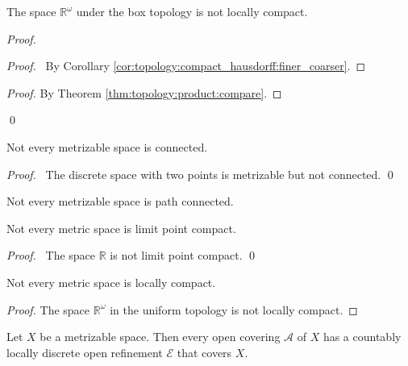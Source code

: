 \begin{prop}
The space $\mathbb{R}^\omega$ under the box topology is not locally compact.
\end{prop}

\begin{proof}
\pf
{}
\begin{proof}
  \pf\ By Corollary \ref{cor:topology:compact_hausdorff:finer_coarser}.
\end{proof}
\begin{proof}
  \pf By Theorem \ref{thm:topology:product:compare}.
\end{proof}
\qed
\end{proof}

\begin{prop}
Not every metrizable space is connected.
\end{prop}

\begin{proof}
\pf\ The discrete space with two points is metrizable but not connected. \qed
\end{proof}

\begin{cor}
Not every metrizable space is path connected.
\end{cor}

\begin{prop}
Not every metric space is limit point compact.
\end{prop}

\begin{proof}
\pf\ The space $\mathbb{R}$ is not limit point compact. \qed
\end{proof}

\begin{prop}
Not every metric space is locally compact.
\end{prop}

\begin{proof}
The space $\mathbb{R}^\omega$ in the uniform topology is not locally compact.
\end{proof}

\begin{lm}[AC]
\label{lm:topology:metric:locally_discrete_open_refinement}
Let $X$ be a metrizable space. Then every open covering $\mathcal{A}$ of $X$ has a countably locally discrete open refinement $\mathcal{E}$ that covers $X$.
\end{lm}

